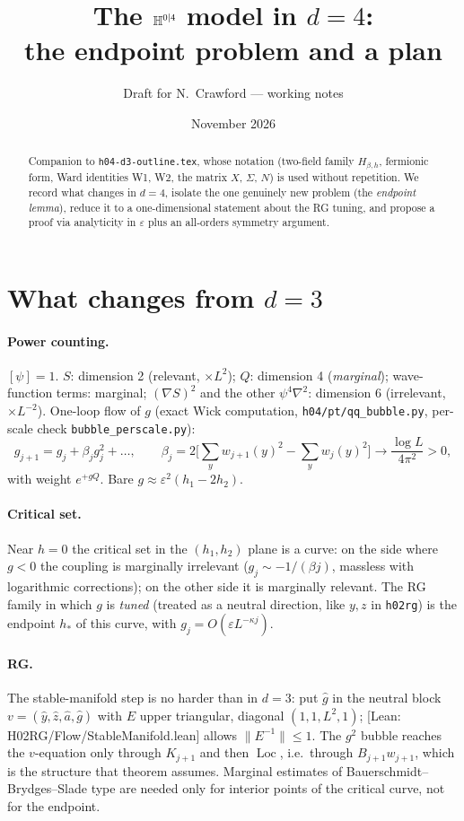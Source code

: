 \documentclass[11pt]{article}
\title{The $\mathbb{H}^{0|4}$ model in $d=4$:\\ the endpoint problem and a plan}
\author{Draft for N.~Crawford --- working notes}
\date{November 2026}
\theoremstyle{definition}
\theoremstyle{remark}
\newcommand{\Loc}{\operatorname{Loc}}
\newcommand{\eps}{\varepsilon}
\newcommand{\lean}[1]{\textsf{[Lean: #1]}}
\begin{document}
\maketitle

\begin{abstract}
  Companion to \texttt{h04-d3-outline.tex}, whose notation (two-field family $H_{\beta,h}$,
  fermionic form, Ward identities W1, W2, the matrix $X$, $\Sigma$, $N$) is used without
  repetition. We record what changes in $d=4$, isolate the one genuinely new problem (the
  \emph{endpoint lemma}), reduce it to a one-dimensional statement about the RG tuning, and
  propose a proof via analyticity in $\eps$ plus an all-orders symmetry argument.
\end{abstract}

\section{What changes from $d=3$}

\paragraph{Power counting.} $[\psi]=1$. $S$: dimension 2 (relevant, $\times L^2$);
$Q$: dimension 4 (\emph{marginal}); wave-function terms: marginal; $(\nabla S)^2$ and the other
$\psi^4\nabla^2$: dimension 6 (irrelevant, $\times L^{-2}$). One-loop flow of $g$ (exact Wick
computation, \texttt{h04/pt/qq\_bubble.py}, per-scale check \texttt{bubble\_perscale.py}):
\[
  g_{j+1}=g_j+\beta_jg_j^2+\dots,\qquad \beta_j=2\Big[\sum_y w_{j+1}(y)^2-\sum_yw_j(y)^2\Big]
  \to\frac{\log L}{4\pi^2}>0,
\]
with weight $e^{+gQ}$. Bare $g\approx\eps^2(h_1-2h_2)$.

\paragraph{Critical set.} Near $h=0$ the critical set in the $(h_1,h_2)$ plane is a curve:
on the side where $g<0$ the coupling is marginally irrelevant ($g_j\sim-1/(\beta j)$, massless
with logarithmic corrections); on the other side it is marginally relevant. The RG family
in which $g$ is \emph{tuned} (treated as a neutral direction, like $y,z$ in \texttt{h02rg})
is the endpoint $h_*$ of this curve, with $g_j=O(\eps L^{-\kappa j})$.

\paragraph{RG.} The stable-manifold step is no harder than in $d=3$: put $\hat g$ in the
neutral block $v=(\hat y,\hat z,\hat a,\hat g)$ with $E$ upper triangular, diagonal
$(1,1,L^2,1)$; \lean{H02RG/Flow/StableManifold.lean} allows $\|E^{-1}\|\le1$. The $g^2$ bubble
reaches the $v$-equation only through $K_{j+1}$ and then $\Loc$, i.e.\ through
$B_{j+1}w_{j+1}$, which is the structure that theorem assumes. Marginal estimates of
Bauerschmidt--Brydges--Slade type are needed only for interior points of the critical
curve, not for the endpoint.
\end{document}
